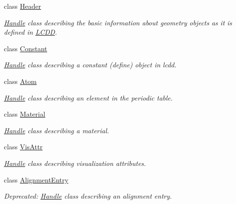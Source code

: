 \begin{DoxyCompactItemize}
class \hyperlink{class_d_d4hep_1_1_geometry_1_1_header}{Header}
\begin{DoxyCompactList}\small\item\em \hyperlink{class_d_d4hep_1_1_handle}{Handle} class describing the basic information about geometry objects as it is defined in \hyperlink{class_d_d4hep_1_1_geometry_1_1_l_c_d_d}{LCDD}. \item\end{DoxyCompactList}\item 
class \hyperlink{class_d_d4hep_1_1_geometry_1_1_constant}{Constant}
\begin{DoxyCompactList}\small\item\em \hyperlink{class_d_d4hep_1_1_handle}{Handle} class describing a constant (define) object in lcdd. \item\end{DoxyCompactList}\item 
class \hyperlink{class_d_d4hep_1_1_geometry_1_1_atom}{Atom}
\begin{DoxyCompactList}\small\item\em \hyperlink{class_d_d4hep_1_1_handle}{Handle} class describing an element in the periodic table. \item\end{DoxyCompactList}\item 
class \hyperlink{class_d_d4hep_1_1_geometry_1_1_material}{Material}
\begin{DoxyCompactList}\small\item\em \hyperlink{class_d_d4hep_1_1_handle}{Handle} class describing a material. \item\end{DoxyCompactList}\item 
class \hyperlink{class_d_d4hep_1_1_geometry_1_1_vis_attr}{VisAttr}
\begin{DoxyCompactList}\small\item\em \hyperlink{class_d_d4hep_1_1_handle}{Handle} class describing visualization attributes. \item\end{DoxyCompactList}\item 
class \hyperlink{class_d_d4hep_1_1_geometry_1_1_alignment_entry}{AlignmentEntry}
\begin{DoxyCompactList}\small\item\em Deprecated: \hyperlink{class_d_d4hep_1_1_handle}{Handle} class describing an alignment entry. \item\end{DoxyCompactList}\item 

\end{DoxyCompactItemize}
